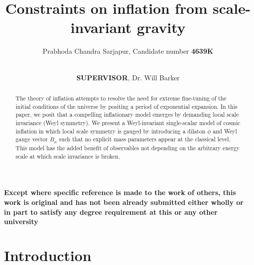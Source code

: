 \documentclass[aps,prd,reprint,preprintnumbers,showpacs,floatfix,nofootinbib,superscript address]{revtex4-2}
\newcommand{\wb}[1]{{\color[RGB]{255,0,0}{\textbf{\textit{[WB: #1]}}}}}
\newcommand{\pcs}[1]{{\color[RGB]{0,100,0}{\textbf{\textit{[PCS: #1]}}}}}
\begin{document}
\title{Constraints on inflation from scale-invariant gravity}

\author{Prabhoda Chandra Sarjapur, Candidate number \textbf{4639K}}

\author{\\\textbf{SUPERVISOR}, Dr. Will Barker}
\begin{widetext}
    \textbf{Except where specific reference is made to the work of others, this work is original and has not been already submitted either wholly or in part to satisfy any degree requirement at this or any other university}
\end{widetext}
\begin{abstract}
The theory of inflation attempts to resolve the need for extreme fine-tuning of the initial conditions of the universe by positing a period of exponential expansion. In this paper, we posit that a compelling inflationary model emerges by demanding local scale invariance (Weyl symmetry). We present a Weyl‐invariant single‐scalar model of cosmic inflation in which local scale symmetry is gauged by introducing a dilaton $\phi$ and Weyl gauge vector $B_\mu$ such that no explicit mass parameters appear at the classical level. This model has the added benefit of observables not depending on the arbitrary energy scale at which scale invariance is broken. 
\end{abstract}


\maketitle
\tableofcontents

\section{Introduction} \label{Introduction}

\end{document}
